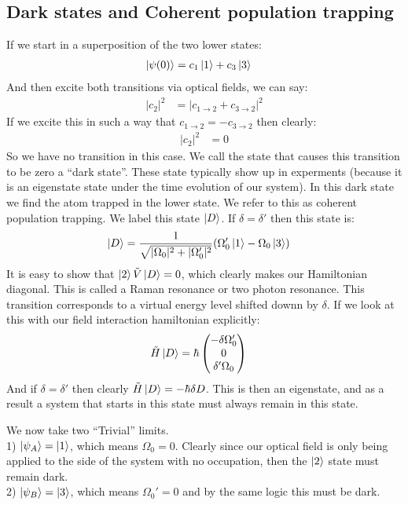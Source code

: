 \subsection{Dark states and Coherent population trapping}
If we start in a superposition of the two lower states:
\begin{align*}
	\ket{\psi(0)} &= c_1\ket{1} + c_3\ket{3}
\end{align*}
And then excite both transitions via optical fields, we can say:
\begin{align*}
	|c_2|^2 &= |c_{1\to2} + c_{3\to2}|^2
\end{align*}
If we excite this in such a way that $c_{1\to2} = - c_{3\to2}$ then clearly:\
\begin{align*}
	|c_2|^2 &= 0
\end{align*}
So we have no transition in this case. We call the state that causes this transition to be zero a ``dark state''. These state typically show up in experments (because it is an eigenstate state under the time evolution of our system).
In this dark state we find the atom trapped in the lower state. We refer to this as coherent population trapping.
We label this state $\ket{D}$. If $\delta = \delta'$ then this state is:
\begin{align*}
	\ket{D} &= \frac{1}{\sqrt{|\Omega_0|^2 + |\Omega_0'|^2}} (\Omega_0'\ket{1} - \Omega_0\ket{3})
\end{align*}
It is easy to show that $\ket{2}\tilde{V}\ket{D} = 0$, which clearly makes our Hamiltonian diagonal.
This is called a Raman resonance or two photon resonance. This transition corresponds to a virtual energy level shifted downn by $\delta$. If we look at this with our field interaction hamiltonian explicitly:
\begin{align*}
	\tilde{H}\ket{D} &= \hbar\begin{pmatrix}
		-\delta\Omega_0' \\
		0 \\
		\delta'\Omega_0
			    \end{pmatrix}
\end{align*}
And if $\delta =\delta'$ then clearly $\tilde{H}\ket{D} = -\hbar \delta D$. This is then an eigenstate, and as a result a system that starts in this state must always remain in this state.

We now take two ``Trivial'' limits.\\
1) $\ket{\psi_A} = \ket{1}$, which means $\Omega_0=0$. Clearly since our optical field is only being applied to the side of the system with no occupation, then the $\ket{2}$ state must remain dark. \\
2) $\ket{\psi_B} = \ket{3}$, which means $\Omega_0'=0$ and by the same logic this must be dark.


